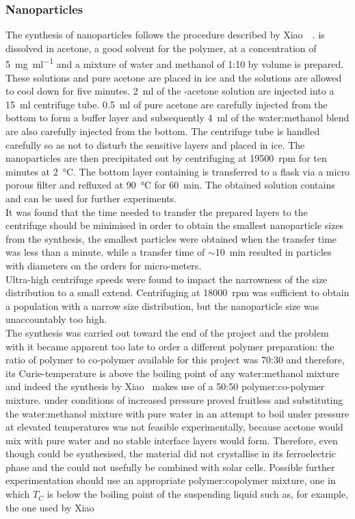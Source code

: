 \subsubsection{\pvtr{} Nanoparticles}
The synthesis of \pvtr{} nanoparticles follows the procedure described by Xiao~\etal{}~\cite{NPsynthesis}. \pvtr{} is dissolved in acetone, a good solvent for the polymer, at a concentration of \SI{5}{\milli\gram\per\milli\litre} and a mixture of water and methanol of 1:10 by volume is prepared. These solutions and pure acetone are placed in ice and the solutions are allowed to cool down for five minutes. \SI{2}{\milli\litre} of the \pvtr{}-acetone solution are injected into a \SI{15}{\milli\litre} centrifuge tube. \SI{0.5}{\milli\litre} of pure acetone are carefully injected from the bottom to form a buffer layer and subsequently \SI{4}{\milli\litre} of the water:methanol blend are also carefully injected from the bottom. The centrifuge tube is handled carefully so as not to disturb the sensitive layers and placed in ice. The nanoparticles are then precipitated out by centrifuging at \SI{19500}{rpm} for ten minutes at \SI{2}{\degreeCelsius}. The bottom layer containing \nps{} is transferred to a flask via a micro porous filter and refluxed at \SI{90}{\degreeCelsius} for \SI{60}{\minute}. The obtained solution contains \pvtr{} \nps{} and can be used for further experiments.\\
It was found that the time needed to transfer the prepared layers to the centrifuge should be minimised in order to obtain the smallest nanoparticle sizes from the synthesis, \ie{} the smallest particles were obtained when the transfer time was less than a minute, while a transfer time of $\sim$\SI{10}{\minute} resulted in particles with diameters on the orders for micro-meters.\\
Ultra-high centrifuge speeds were found to impact the narrowness of the size distribution to a small extend. Centrifuging at \SI{18000}{rpm} was sufficient to obtain a population with a narrow size distribution, but the nanoparticle size was unaccountably too high.\\
The synthesis was carried out toward the end of the project and the problem with it became apparent too late to order a different polymer preparation: the ratio of polymer to co-polymer available for this project was 70:30 and therefore, its Curie-temperature is above the boiling point of any water:methanol mixture and indeed the synthesis by Xiao~\etal{} makes use of a 50:50 polymer:co-polymer mixture.  under conditions of increased pressure proved fruitless and substituting the water:methanol mixture with pure water in an attempt to boil under pressure at elevated temperatures was not feasible experimentally, because acetone would mix with pure water and no stable interface layers would form. Therefore, even though \nps{} could be synthesised, the material did not crystallise in its ferroelectric phase and the \nps{} could not usefully be combined with solar cells. Possible further experimentation should use an appropriate polymer:copolymer mixture, \ie{} one in which $T_C$ is below the boiling point of the suspending liquid such as, for example, the one used by Xiao~\etal{}
